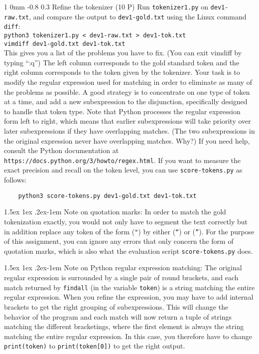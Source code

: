 \documentclass[11pt]{article}
\makeatletter
\newcommand{\newsec}[2]{\section{#1}\label{sec:#2}\noindent}
\renewcommand{\section}{\@startsection
{section}%
{1}%
{0mm}%
{-0.8\baselineskip}%
{0.3\baselineskip}%
{\bfseries\large}}%
\renewcommand{\paragraph}{%
  \@startsection{paragraph}{4}%
  {\z@}{1.5ex \@plus 1ex \@minus .2ex}{-1em}%
  {\normalfont\normalsize\bfseries}%
}\makeatother
\makeatother
\begin{document}
\newsec{Refine the tokenizer (10 P)}{refine}%
Run {\tt tokenizer1.py} on {\tt dev1-raw.txt}, and compare the output
to {\tt dev1-gold.txt} using the Linux command {\tt diff}: \\

\noindent
{\tt python3 tokenizer1.py < dev1-raw.txt > dev1-tok.txt}\\

\noindent
{\tt vimdiff dev1-gold.txt dev1-tok.txt}\\

\clearpage
\noindent
This gives you a list of the problems you have to fix. (You can exit
vimdiff by typing ``:q'') The left column corresponds to the gold
standard token and the right column corresponds to the token given by
the tokenizer. Your task is to modify the regular expression used for
matching in order to eliminate as many of the problems as possible. A
good strategy is to concentrate on one type of token at a time, and
add a new subexpression to the disjunction, specifically designed to
handle that token type. Note that Python processes the regular
expression form left to right, which means that earlier subexpressions
will take priority over later subexpressions if they have overlapping
matches. (The two subexpressions in the original expression never have
overlapping matches. Why?) If you need help, consult the Python
documentation at {\tt https://docs.python.org/3/howto/regex.html}. If
you want to measure the exact precision and recall on the token level,
you can use {\tt score-tokens.py} as follows:
\begin{verbatim}
    python3 score-tokens.py dev1-gold.txt dev1-tok.txt
\end{verbatim}


\paragraph{Note on quotation marks:} In order to match the gold
tokenization exactly, you would not only have to segment the text
correctly but in addition replace any token of the form ({\tt "}) by
either ({\tt ``}) or ({\tt ''}). For the purpose of this assignment,
you can ignore any errors that only concern the form of quotation
marks, which is also what the evaluation script {\tt score-tokens.py}
does.

\paragraph{Note on Python regular expression matching:} The original
regular expression is surrounded by a single pair of round brackets,
and each match returned by {\tt findall} (in the variable {\tt token})
is a string matching the entire regular expression. When you refine
the expression, you may have to add internal brackets to get the right
grouping of subexpressions. This will change the behavior of the
program and each match will now return a tuple of strings matching the
different bracketings, where the first element is always the string
matching the entire regular expression. In this case, you therefore
have to change {\tt print(token)} to {\tt print(token[0])} to get the
right output.
 
\end{document}
